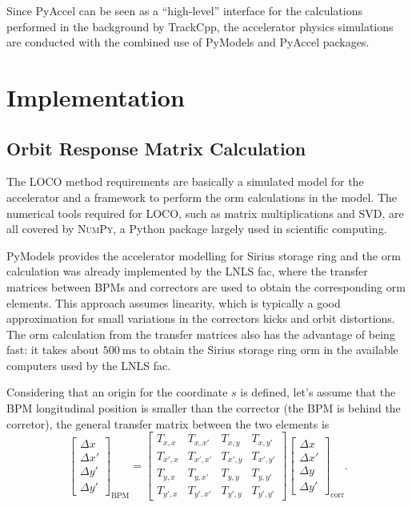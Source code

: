 Since PyAccel can be seen as a ``high-level'' interface for the calculations performed in the background by TrackCpp, the accelerator physics simulations are conducted with the combined use of PyModels and PyAccel packages.
\section{Implementation}

\subsection{Orbit Response Matrix Calculation}
The LOCO method requirements are basically a simulated model for the accelerator and a framework to perform the \gls{orm} calculations in the model. The numerical tools required for LOCO, such as matrix multiplications and SVD, are all covered by \textsc{NumPy}, a Python package largely used in scientific computing. 

PyModels provides the accelerator modelling for Sirius storage ring and the \gls{orm} calculation was already implemented by the LNLS \gls{fac}, where the transfer matrices between BPMs and correctors are used to obtain the corresponding \gls{orm} elements. This approach assumes linearity, which is typically a good approximation for small variations in the correctors kicks and orbit distortions. The \gls{orm} calculation from the transfer matrices also has the advantage of being fast: it takes about $\SI{500}{\milli\second}$ to obtain the Sirius storage ring \gls{orm} in the available computers used by the LNLS \gls{fac}.

Considering that an origin for the coordinate $s$ is defined, let's assume that the BPM longitudinal position is smaller than the corrector (the BPM is behind the corretor), the general transfer matrix between the two elements is
\begin{equation}
    \begin{bmatrix}
    \Delta x \\
    \Delta x' \\
    \Delta y' \\
    \Delta y'
    \end{bmatrix}_{\mathrm{BPM}}  =
    \begin{bmatrix}
    T_{x, x} & T_{x, x'} & T_{x, y} & T_{x, y'} \\
    T_{x', x} & T_{x', x'} & T_{x', y} & T_{x', y'} \\
    T_{y, x} & T_{y, x'} & T_{y, y} & T_{y, y'} \\
    T_{y', x} & T_{y', x'} & T_{y', y} & T_{y', y'} 
    \end{bmatrix} 
    \begin{bmatrix}
    \Delta x \\
    \Delta x' \\
    \Delta y \\
    \Delta y'
    \end{bmatrix}_{\mathrm{corr}}.
\end{equation}

